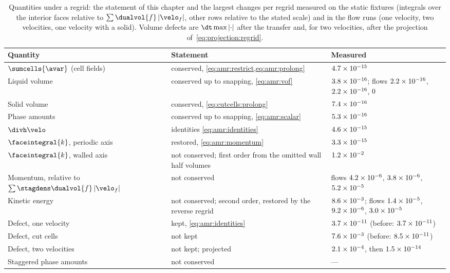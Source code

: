 \begin{table}
  \centering\small
  \caption{Quantities under a regrid: the statement of this chapter and the
    largest changes per regrid measured on the static fixtures (integrals over
    the interior faces relative to $\sum\dualvol{f}\abs{\velo_f}$, other rows relative to the
    stated scale) and in the flow runs (one velocity, two velocities, one
    velocity with a solid). Volume defects are $\dt\max\abs{\cdot}$ after the
    transfer and, for two velocities, after the projection
    of~\cref{eq:projection:regrid}.}
  \label{tab:amr:conservation}
  \begin{tabular}{@{}>{\raggedright}p{3.0cm}>{\raggedright}p{3.8cm}>{\raggedright\arraybackslash}p{5.2cm}@{}}
    \toprule
    Quantity & Statement & Measured\\
    \midrule
    $\sumcells{\avar}$ (cell fields) & conserved, \cref{eq:amr:restrict,eq:amr:prolong} & $4.7\times10^{-15}$\\
    Liquid volume & conserved up to snapping, \cref{eq:amr:vof} & $3.8\times10^{-16}$; flows $2.2\times10^{-16}$, $2.2\times10^{-16}$, $0$\\
    Solid volume & conserved, \cref{eq:cutcells:prolong} & $7.4\times10^{-16}$\\
    Phase amounts & conserved up to snapping, \cref{eq:amr:scalar} & $5.3\times10^{-16}$\\
    $\divh\velo$ & identities \cref{eq:amr:identities} & $4.6\times10^{-15}$\\
    $\faceintegral{k}$, periodic axis & restored, \cref{eq:amr:momentum} & $3.3\times10^{-15}$\\
    $\faceintegral{k}$, walled axis & not conserved; first order from the omitted wall half volumes & $1.2\times10^{-2}$\\
    Momentum, relative to $\sum\stagdens\dualvol{f}\abs{\velo_f}$ & not conserved & flows $4.2\times10^{-6}$, $3.8\times10^{-6}$, $5.2\times10^{-5}$\\
    Kinetic energy & not conserved; second order, restored by the reverse regrid & $8.6\times10^{-3}$; flows $1.4\times10^{-5}$, $9.2\times10^{-6}$, $3.0\times10^{-5}$\\
    Defect, one velocity & kept, \cref{eq:amr:identities} & $3.7\times10^{-11}$ (before: $3.7\times10^{-11}$)\\
    Defect, cut cells & not kept & $7.6\times10^{-3}$ (before: $8.5\times10^{-11}$)\\
    Defect, two velocities & not kept; projected & $2.1\times10^{-4}$, then $1.5\times10^{-14}$\\
    Staggered phase amounts & not conserved & ---\\
    \bottomrule
  \end{tabular}
\end{table}

